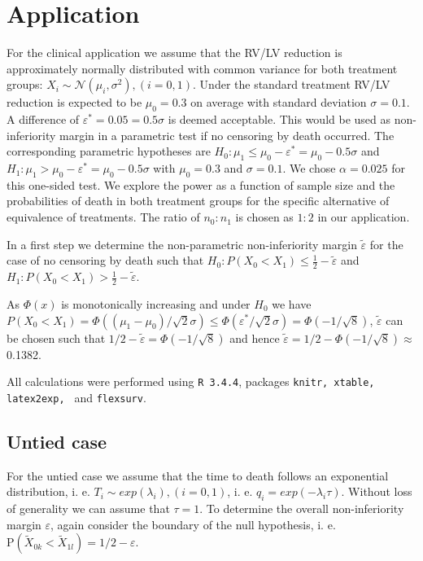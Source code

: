 \documentclass[bimj,fleqn]{w-art}\usepackage[]{graphicx}\usepackage[]{color}
\theoremstyle{plain}
\theoremstyle{definition}
\begin{document}
\section{Application}
\label{sec:Application}
  For the clinical application we assume that the RV/LV reduction is approximately normally distributed
with common variance for both treatment groups:
$X_i \sim \mathcal{N} ( \mu_i, \sigma^2 ), (i = 0, 1)$. Under the standard treatment RV/LV reduction
is expected to be $\mu_0 = 0.3$ on average with standard deviation $\sigma= 0.1$. A difference of
$\varepsilon^{*} = 0.05 = 0.5 \sigma$ is deemed acceptable. This would be used as non-inferiority
margin in a parametric test if no censoring by death occurred. The corresponding parametric hypotheses
are $H_0: \mu_1 \leq \mu_0 - \varepsilon^{*}  = \mu_0 - 0.5 \sigma $ and
$H_1: \mu_1 > \mu_0 - \varepsilon^{*} = \mu_0 - 0.5 \sigma $ with $\mu_0 = 0.3$ and $\sigma = 0.1$.
We chose $\alpha = 0.025$ for this one-sided test.
We explore the power as a function of sample size and the probabilities of death in
both treatment groups for the specific alternative of equivalence of treatments.
The ratio of $n_0 : n_1$ is chosen as $1 : 2 $ in our application.

In a first step we determine the non-parametric non-inferiority margin $\tilde{\varepsilon}$
for the case of no censoring by death such that
$H_0: P(X_0 < X_1) \leq \frac{1}{2} - \tilde{\varepsilon}$ and
$H_1: P(X_0 < X_1) >  \frac{1}{2} - \tilde{\varepsilon}$.

 As $\Phi(x)$ is monotonically increasing and under $H_0$ we have
 $P(X_0 < X_1) = \Phi((\mu_1 - \mu_0)/\sqrt{2}\sigma) \leq \Phi(\varepsilon^{*}/ \sqrt{2}\sigma) = \Phi(-1/\sqrt{8}) $,
 $\tilde{\varepsilon}$ can be chosen such that
 $1/2 - \tilde{\varepsilon} = \Phi(-1/\sqrt{8}) $ and hence
 $\tilde{\varepsilon} = 1/2 - \Phi(-1/\sqrt{8})  \approx $ 0.1382.

All calculations were performed using {\tt{R 3.4.4}}, packages {\tt{knitr, xtable, latex2exp, }} and
{\tt{flexsurv}}.

\subsection{Untied case}
\label{sec:AppUntied}
For the untied case we assume that the time to death follows an exponential distribution, i. e.
$T_i \sim exp(\lambda_i), (i=0,1)$, i. e. $q_i = exp(-\lambda_i \tau)$. Without
loss of generality we can assume that $\tau = 1$. To determine the overall
non-inferiority margin $\varepsilon$, again consider the boundary of the null hypothesis,
i. e. $\text{P}(\widetilde{X}_{0k} < \widetilde{X}_{1l}) = 1/2 - \varepsilon $.
\end{document}
